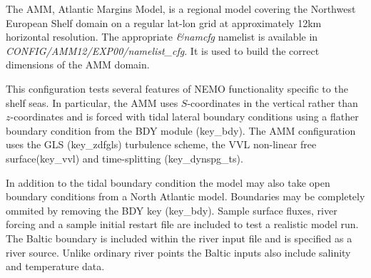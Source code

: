 The AMM, Atlantic Margins Model, is a regional model covering the
Northwest European Shelf domain on a regular lat-lon grid at
approximately 12km horizontal resolution. The appropriate 
\textit{\&namcfg} namelist  is available in \textit{CONFIG/AMM12/EXP00/namelist\_cfg}.
It is used to build the correct dimensions of the AMM domain.

This configuration tests several features of NEMO functionality specific
to the shelf seas.
In particular, the AMM uses $S$-coordinates in the vertical rather than
$z$-coordinates and is forced with tidal lateral boundary conditions
using a flather boundary condition from the BDY module (key\_bdy).
The AMM configuration  uses the GLS (key\_zdfgls) turbulence scheme, the
VVL non-linear free surface(key\_vvl) and time-splitting
(key\_dynspg\_ts).

In addition to the tidal boundary condition the model may also take
open boundary conditions from a North Atlantic model. Boundaries may be
completely ommited by removing the BDY key (key\_bdy).
Sample surface fluxes, river forcing and a sample initial restart file
are included to test a realistic model run. The Baltic boundary is
included within the river input file and is specified as a river source.
Unlike ordinary river points the Baltic inputs also include salinity and
temperature data.

